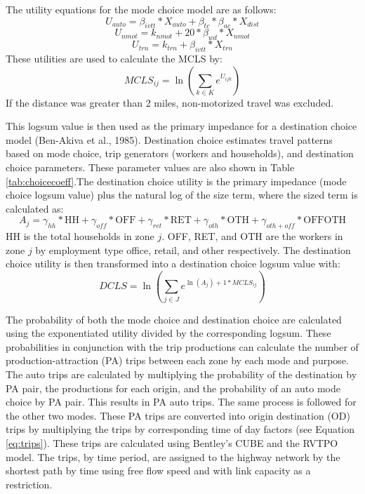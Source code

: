 \documentclass[fancy, masters]{byuthesis}
\begin{document}
The utility equations for the mode choice model are as follows:
\begin{equation}
U_{auto} = \beta_{ivtt} * X_{auto} + \beta_{tc} * \beta_{ac} * X_{dist}
\label{eq:driveutil}
\end{equation} \begin{equation}
U_{nmot} = k_{nmot} + 20 * \beta_{wd}*X_{nmot}
\label{eq:nonmoutil}
\end{equation} \begin{equation}
U_{trn} = k_{trn} + \beta_{ivtt} * X_{trn}
\label{eq:transutil}
\end{equation}
These utilities are used to calculate the MCLS by:
\begin{equation}
MCLS_{ij} = \ln(\sum_{k \in K} e^{U_{ijk}})
\label{eq:mcls}
\end{equation}
If the distance was greater than 2 miles, non-motorized travel was excluded.

This logsum value is then used as the primary impedance for a destination choice model (Ben-Akiva et al., 1985). Destination choice estimates travel patterns based on mode choice, trip generators (workers and households), and destination choice parameters. These parameter values are also shown in Table \ref{tab:choicecoeff}.The destination choice utility is the primary impedance (mode choice logsum value) plus the natural log of the size term, where the sized term is calculated as:
\begin{equation}
A_j = \gamma_{hh} * \mathrm{HH} + \gamma_{off} * \mathrm{OFF} + \gamma_{ret} * \mathrm{RET} + \gamma_{oth} * \mathrm{OTH} + \gamma_{oth+off} * \mathrm{OFFOTH}
\label{eq:dcsizeterm}
\end{equation}
HH is the total households in zone \(j\). OFF, RET, and OTH are the workers in zone \(j\) by employment type office, retail, and other respectively. The destination choice utility is then transformed into a destination choice logsum value with:
\begin{equation}
DCLS = \ln (\sum_{j \in J} e^{\ln(A_j) + 1* MCLS_{ij}} )
\label{eq:dcls}
\end{equation}

The probability of both the mode choice and destination choice are calculated using the exponentiated utility divided by the corresponding logsum. These probabilities in conjunction with the trip productions can calculate the number of production-attraction (PA) trips between each zone by each mode and purpose. The auto trips are calculated by multiplying the probability of the destination by PA pair, the productions for each origin, and the probability of an auto mode choice by PA pair. This results in PA auto trips. The same process is followed for the other two modes. These PA trips are converted into origin destination (OD) trips by multiplying the trips by corresponding time of day factors (see Equation \eqref{eq:trips}). These trips are calculated using Bentley's CUBE and the RVTPO model. The trips, by time period, are assigned to the highway network by the shortest path by time using free flow speed and with link capacity as a restriction.
\end{document}

